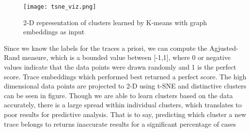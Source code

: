  
 \begin{figure}
\texttt{[image: tsne\_viz.png]}
\caption{2-D representation of clusters learned by K-means with graph embeddings as input}
\label{Clusters}
\end{figure}
 
Since we know the labels for the traces a priori, we can compute the Agjusted-Rand measure, which is a bounded value between [-1,1], where 0 or negative values indicate that the data points were drawn randomly and 1 is the perfect score.  Trace embeddings which performed best returned a perfect score. The high dimensional data points are projected to 2-D using t-SNE and distinctive clusters can be seen in figure. Though we are able to learn clusters based on the data accurately, there is a large spread within individual clusters, which translates to poor results for predictive analysis. That is to say, predicting which cluster a new trace belongs to returns inaccurate results for a significant percentage of cases

